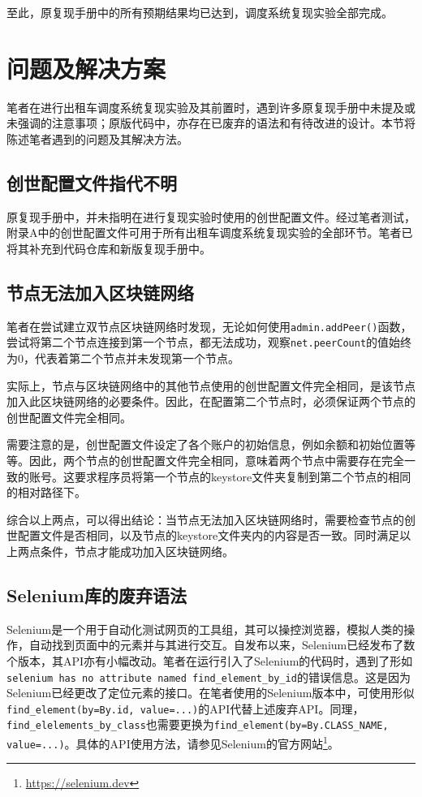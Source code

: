 至此，原复现手册中的所有预期结果均已达到，调度系统复现实验全部完成。

\section{问题及解决方案}

笔者在进行出租车调度系统复现实验及其前置时，遇到许多原复现手册中未提及或未强调的注意事项；原版代码中，亦存在已废弃的语法和有待改进的设计。本节将陈述笔者遇到的问题及其解决方法。

\subsection{创世配置文件指代不明}

原复现手册中，并未指明在进行复现实验时使用的创世配置文件。经过笔者测试，附录A中的创世配置文件可用于所有出租车调度系统复现实验的全部环节。笔者已将其补充到代码仓库和新版复现手册中。

\subsection{节点无法加入区块链网络}

笔者在尝试建立双节点区块链网络时发现，无论如何使用\verb|admin.addPeer()|函数，尝试将第二个节点连接到第一个节点，都无法成功，观察\verb|net.peerCount|的值始终为0，代表着第二个节点并未发现第一个节点。

实际上，节点与区块链网络中的其他节点使用的创世配置文件完全相同，是该节点加入此区块链网络的必要条件。因此，在配置第二个节点时，必须保证两个节点的创世配置文件完全相同。

需要注意的是，创世配置文件设定了各个账户的初始信息，例如余额和初始位置等等。因此，两个节点的创世配置文件完全相同，意味着两个节点中需要存在完全一致的账号。这要求程序员将第一个节点的keystore文件夹复制到第二个节点的相同的相对路径下。

综合以上两点，可以得出结论：当节点无法加入区块链网络时，需要检查节点的创世配置文件是否相同，以及节点的keystore文件夹内的内容是否一致。同时满足以上两点条件，节点才能成功加入区块链网络。

\subsection{Selenium库的废弃语法}

Selenium是一个用于自动化测试网页的工具组，其可以操控浏览器，模拟人类的操作，自动找到页面中的元素并与其进行交互。自发布以来，Selenium已经发布了数个版本，其API亦有小幅改动。笔者在运行引入了Selenium的代码时，遇到了形如\verb|selenium has no attribute named find_element_by_id|的错误信息。这是因为Selenium已经更改了定位元素的接口。在笔者使用的Selenium版本中，可使用形似\verb|find_element(by=By.id, value=...)|的API代替上述废弃API。同理，\verb|find_elelements_by_class|也需要更换为\verb|find_element(by=By.CLASS_NAME, value=...)|。具体的API使用方法，请参见Selenium的官方网站\footnote{\url{https://selenium.dev}}。

